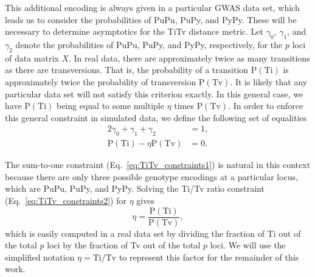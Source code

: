 \documentclass[10pt,letterpaper]{article}
\begin{document}


This additional encoding is always given in a particular GWAS data set, which leads us to consider the probabilities of PuPu, PuPy, and PyPy. These will be necessary to determine asymptotics for the TiTv distance metric. Let $\gamma_0$, $\gamma_1$, and $\gamma_2$ denote the probabilities of PuPu, PuPy, and PyPy, respectively, for the $p$ loci of data matrix $X$. In real data, there are approximately twice as many transitions as there are transversions. That is, the probability of a transition $\text{P}(\text{Ti})$ is approximately twice the probability of transversion $\text{P}(\text{Tv})$. It is likely that any particular data set will not satisfy this criterion exactly. In this general case, we have $\text{P}(\text{Ti})$ being equal to some multiple $\eta$ times $\text{P}(\text{Tv})$. In order to enforce this general constraint in simulated data, we define the following set of equalities
%
\begin{alignat}{2}\label{eq:TiTv_constraints1}
\gamma_0 + \gamma_1 + \gamma_2 &= 1, \\ \label{eq:TiTv_constraints2}
\text{P}(\text{Ti}) - \eta \text{P}(\text{Tv}) &= 0.
\end{alignat}

The sum-to-one constraint (Eq.~\ref{eq:TiTv_constraints1}) is natural in this context because there are only three possible genotype encodings at a particular locus, which are PuPu, PuPy, and PyPy. Solving the Ti/Tv ratio constraint (Eq.~\ref{eq:TiTv_constraints2}) for $\eta$ gives
%
\[
\eta = \frac{\text{P}(\text{Ti})}{\text{P}(\text{Tv})},
\]
%
which is easily computed in a real data set by dividing the fraction of Ti out of the total $p$ loci by the fraction of Tv out of the total $p$ loci. We will use the simplified notation $\eta=\text{Ti}/\text{Tv}$ to represent this factor for the remainder of this work.
\end{document}
